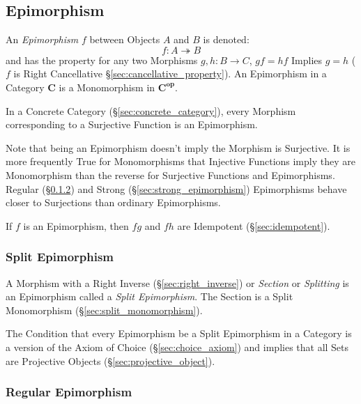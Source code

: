 \subsection{Epimorphism}\label{sec:epimorphism}

An \emph{Epimorphism} $f$ between Objects $A$ and $B$ is denoted:
\[
  f : A \twoheadrightarrow B
\]
and has the property for any two Morphisms $g, h : B \rightarrow C$,
$gf = hf$ Implies $g = h$ ($f$ is Right Cancellative
\S\ref{sec:cancellative_property}). An Epimorphism in a Category
$\mathbf{C}$ is a Monomorphism in $\mathbf{C^{op}}$.

In a Concrete Category (\S\ref{sec:concrete_category}), every Morphism
corresponding to a Surjective Function is an Epimorphism.

\HandRight\; Note that being an Epimorphism doesn't imply the Morphism
is Surjective. It is more frequently True for Monomorphisms that
Injective Functions imply they are Monomorphism than the reverse for
Surjective Functions and Epimorphisms. Regular
(\S\ref{sec:regular_epimorphism}) and Strong
(\S\ref{sec:strong_epimorphism}) Epimorphisms behave closer to
Surjections than ordinary Epimorphisms.

If $f$ is an Epimorphism, then $fg$ and $fh$ are Idempotent
(\S\ref{sec:idempotent}). %



\subsubsection{Split Epimorphism}\label{sec:split_epimorphism}

A Morphism with a Right Inverse (\S\ref{sec:right_inverse}) or
\emph{Section} or \emph{Splitting} is an Epimorphism called a
\emph{Split Epimorphism}. The Section is a Split Monomorphism
(\S\ref{sec:split_monomorphism}).

The Condition that every Epimorphism be a Split Epimorphism in a
Category is a version of the Axiom of Choice
(\S\ref{sec:choice_axiom}) and implies that all Sets are Projective
Objects (\S\ref{sec:projective_object}).\cite{awodey06}



\subsubsection{Regular Epimorphism}\label{sec:regular_epimorphism}

